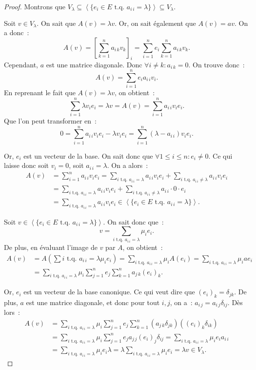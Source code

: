 \documentclass{article}
\newcommand{\eng}[1]{\left\langle#1\right\rangle}
\newcommand{\tq}{\textrm{ t.q. }}
\theoremstyle{definition}
\theoremstyle{remark}
\begin{document}
		\begin{proof} Montrons que $V_\lambda \subseteq \eng {\{e_i \in E \tq a_{i\,i} = \lambda\}} \subseteq V_\lambda$.

		Soit $v \in V_\lambda$. On sait que $A(v) = \lambda v$. Or, on sait également que $A(v) = av$. On a donc~:
		\[A(v) = \left[\sum_{k=1}^na_{i\,k}v_k\right]_i= \sum_{i=1}^ne_i\sum_{k=1}^na_{i\,k}v_k.\]
		Cependant, $a$ est une matrice diagonale. Donc $\forall i \neq k : a_{i\,k} = 0$. On trouve donc~:
		\[A(v) = \sum_{i=1}^ne_ia_{i\,i}v_i.\]
		En reprenant le fait que $A(v) = \lambda v$, on obtient~:
		\[\sum_{i=1}^n\lambda v_ie_i = \lambda v = A(v) = \sum_{i=1}^na_{i\,i}v_ie_i.\]
		Que l'on peut transformer en~:
		\[0 = \sum_{i=1}^na_{i\,i}v_ie_i - \lambda v_ie_i = \sum_{i=1}^n(\lambda - a_{i\,i})v_ie_i.\]

		Or, $e_i$ est un vecteur de la base. On sait donc que $\forall 1 \leq i \leq n : e_i \neq 0$. Ce qui laisse donc soit $v_i = 0$, soit $a_{i\,i} = \lambda$.
		On a alors~:
		\[\begin{aligned}
			A(v) &= \sum_{i=1}^na_{i\,i}v_ie_i = \sum_{i \tq a_{i\,i} = \lambda}a_{i\,i}v_ie_i + \sum_{i \tq a_{i\,i} \neq \lambda}a_{i\,i}v_ie_i \\
			     &= \sum_{i \tq a_{i\,i} = \lambda}a_{i\,i}v_ie_i + \sum_{i \tq a_{i\,i} \neq \lambda}a_{i\,i} \cdot 0 \cdot e_i \\
				 &= \sum_{i \tq a_{i\,i} = \lambda}a_{i\,i}v_ie_i \in \eng {\{e_i \in E \tq a_{i\,i} = \lambda\}}.
		\end{aligned}\]

		Soit $v \in \eng {\{e_i \in E \tq a_{i\,i} = \lambda\}}$. On sait donc que~:
		\[v = \sum_{i \tq a_{i\,i} = \lambda}\mu_ie_i.\]
		De plus, en évaluant l'image de $v$ par $A$, on obtient~:
		\[\begin{aligned}
			A(v) &= A\left(\sum{i \tq a_{i\,i} = \lambda}\mu_ie_i\right) = \sum_{i \tq a_{i\,i}=\lambda}\mu_iA(e_i)= \sum_{i \tq a_{i\,i}=\lambda}\mu_iae_i \\
			     &= \sum_{i \tq a_{i\,i}=\lambda}\mu_i\sum_{j=1}^ne_j\sum_{k=1}^na_{j\,k}\left(e_i\right)_k.
		\end{aligned}\]

		Or, $e_i$ est un vecteur de la base canonique. Ce qui veut dire que $\left(e_i\right)_k = \delta_{jk}$. De plus, $a$ est une matrice diagonale, et donc
		pour tout $i, j$, on a~: $a_{i\,j} = a_{i\,j}\delta_{ij}$. Dès lors~:
		\[\begin{aligned}
			A(v) &=\sum_{i \tq a_{i\,i}=\lambda}\mu_i\sum_{j=1}^ne_j\sum_{k=1}^n\left(a_{j\,k}\delta_{jk}\right)\left(\left(e_i\right)_k\delta_{ik}\right) \\
			     &= \sum_{i \tq a_{i\,i}=\lambda}\mu_i\sum_{j=1}^ne_ja_{j\,j}\left(e_i\right)_j\delta_{ij} = \sum_{i \tq a_{i\,i}=\lambda}\mu_ie_ia_{i\,i} \\
				 &= \sum_{i \tq a_{i\,i}=\lambda}\mu_ie_i\lambda = \lambda\sum_{i \tq a_{i\,i}=\lambda}\mu_ie_i = \lambda v \in V_\lambda.
		\end{aligned}\]
		\end{proof}
\end{document}
